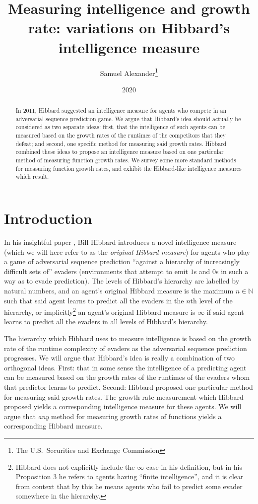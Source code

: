 \documentclass{article}
\title{Measuring intelligence and growth rate: variations on
Hibbard's intelligence measure}
\author{Samuel Alexander\thanks{The U.S.\ Securities and Exchange Commission}}
\date{2020}
\begin{document}
\maketitle

\begin{abstract}
    In 2011, Hibbard suggested an intelligence measure for agents
    who compete in an adversarial sequence prediction game. We argue
    that Hibbard's idea should actually be considered as two separate
    ideas: first, that the intelligence of such agents can be measured
    based on the growth rates of the runtimes of the competitors that
    they defeat; and second, one specific method for measuring said
    growth rates. Hibbard combined these ideas to propose an intelligence
    measure based on one particular method of measuring function growth
    rates. We survey some more standard methods for measuring function
    growth rates, and exhibit the Hibbard-like intelligence measures
    which result.
\end{abstract}

\section{Introduction}

In his insightful paper \cite{hibbard}, Bill Hibbard introduces a novel
intelligence measure (which we will here refer to as the \emph{original Hibbard measure})
for agents who play a game of adversarial sequence prediction
\cite{hibbard2008adversarial}
``against a hierarchy of increasingly difficult sets of'' evaders (environments that attempt
to emit $1$s and $0$s in such a way as to evade prediction).
The levels of Hibbard's hierarchy are labelled by natural numbers, and
an agent's original Hibbard measure is the maximum $n\in\mathbb N$ such that
said agent learns to predict all the evaders in the $n$th level of the hierarchy,
or implicitly\footnote{Hibbard does not explicitly include the $\infty$ case in his
definition, but in his Proposition 3 he refers to agents having ``finite intelligence'', and
it is clear from context that by this he means agents who fail to predict some evader
somewhere in the hierarchy.} an agent's original Hibbard measure is $\infty$
if said agent learns to predict all the evaders in all levels of Hibbard's hierarchy.

The hierarchy which Hibbard uses to measure intelligence is based on the growth
rate of the runtime complexity of evaders as the adversarial sequence prediction
progresses. We will argue that Hibbard's idea is really a combination of two
orthogonal ideas. First: that in some sense the intelligence of a predicting agent
can be measured based on the growth rates of the runtimes of the evaders whom that
predictor learns to predict. Second: Hibbard proposed one particular method for
measuring said growth rates. The growth rate measurement which Hibbard proposed yields
a corresponding intelligence measure for these agents. We will argue that \emph{any}
method for measuring growth rates of functions yields a corresponding Hibbard measure.
\end{document}
